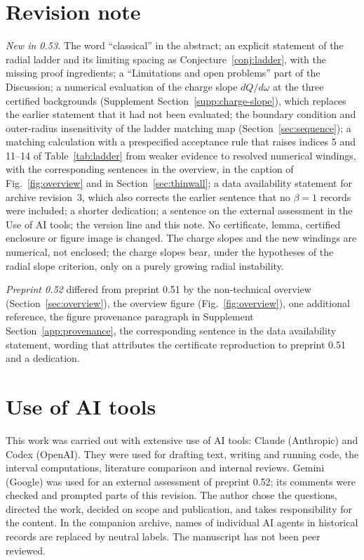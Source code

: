 \documentclass[a4paper,11pt]{article}
\begin{document}
\section*{Revision note}
\emph{New in 0.53.} The word ``classical'' in the abstract; an explicit
statement of the radial ladder and its limiting spacing as
Conjecture~\ref{conj:ladder}, with the missing proof ingredients; a
``Limitations and open problems'' part of the Discussion; a numerical
evaluation of the charge slope $dQ/d\omega$ at the three certified
backgrounds (Supplement Section~\ref{supp:charge-slope}), which replaces
the earlier statement that it had not been evaluated; the boundary
condition and outer-radius insensitivity of the ladder matching map
(Section~\ref{sec:sequence}); a matching calculation with a
prespecified acceptance rule that raises indices 5 and 11--14 of
Table~\ref{tab:ladder} from weaker evidence to resolved numerical
windings, with the corresponding sentences in the overview, in the
caption of Fig.~\ref{fig:overview} and in Section~\ref{sec:thinwall};
a data availability statement for archive revision~3, which also
corrects the earlier sentence that no $\beta=1$ records were included;
a shorter dedication; a sentence on the external assessment in the
Use of AI tools;
the version line and this note.
No certificate, lemma, certified enclosure or figure image is changed.
The charge slopes and the new windings are numerical, not enclosed; the
charge slopes bear, under the hypotheses of the radial slope criterion,
only on a purely growing radial instability.

\emph{Preprint 0.52} differed from preprint 0.51 by the non-technical
overview (Section~\ref{sec:overview}), the overview figure
(Fig.~\ref{fig:overview}), one additional reference, the figure
provenance paragraph in Supplement Section~\ref{app:provenance}, the
corresponding sentence in the data availability statement, wording that
attributes the certificate reproduction to preprint 0.51 and a
dedication.

\section*{Use of AI tools}
This work was carried out with extensive use of AI tools: Claude
(Anthropic) and Codex (OpenAI). They were used for drafting text,
writing and running code, the interval computations, literature
comparison and internal reviews. Gemini (Google) was used for an
external assessment of preprint 0.52; its comments were checked and
prompted parts of this revision. The author chose the questions,
directed the work, decided on scope and publication, and takes
responsibility for the content. In the companion archive, names of
individual AI agents in historical records are replaced by neutral
labels. The manuscript has not been peer reviewed.
\appendix


\end{document}
